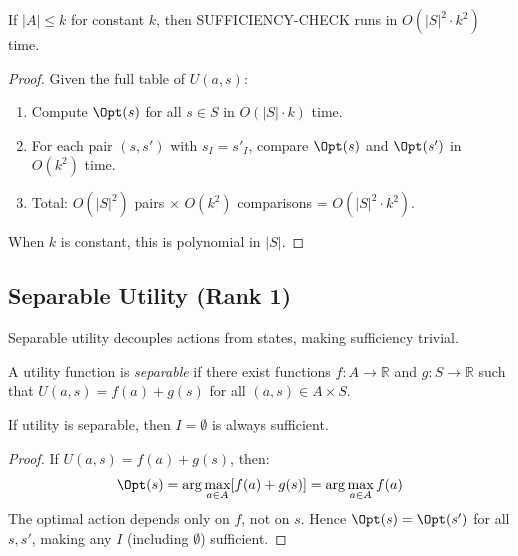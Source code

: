 \begin{theorem}\label{thm:bounded-actions}
If $|A| \leq k$ for constant $k$, then SUFFICIENCY-CHECK runs in $O(|S|^2 \cdot k^2)$ time.
\end{theorem}


\begin{proof}
Given the full table of $U(a,s)$:
\begin{enumerate}
\item Compute $\Opt(s)$ for all $s \in S$ in $O(|S| \cdot k)$ time.
\item For each pair $(s, s')$ with $s_I = s'_I$, compare $\Opt(s)$ and $\Opt(s')$ in $O(k^2)$ time.
\item Total: $O(|S|^2)$ pairs $\times$ $O(k^2)$ comparisons = $O(|S|^2 \cdot k^2)$.
\end{enumerate}
When $k$ is constant, this is polynomial in $|S|$.
\end{proof}

\subsection{Separable Utility (Rank 1)}\label{sec:tract-separable}

Separable utility decouples actions from states, making sufficiency trivial.

\begin{definition}\label{def:separable}
A utility function is \emph{separable} if there exist functions $f : A \to \mathbb{R}$ and $g : S \to \mathbb{R}$ such that $U(a,s) = f(a) + g(s)$ for all $(a,s) \in A \times S$.
\end{definition}

\begin{theorem}\label{thm:separable}
If utility is separable, then $I = \emptyset$ is always sufficient.
\end{theorem}


\begin{proof}
If $U(a, s) = f(a) + g(s)$, then:
\[
\Opt(s) = \arg\max_{a \in A} [f(a) + g(s)] = \arg\max_{a \in A} f(a)
\]
The optimal action depends only on $f$, not on $s$. Hence $\Opt(s) = \Opt(s')$ for all $s, s'$, making any $I$ (including $\emptyset$) sufficient.
\end{proof}

